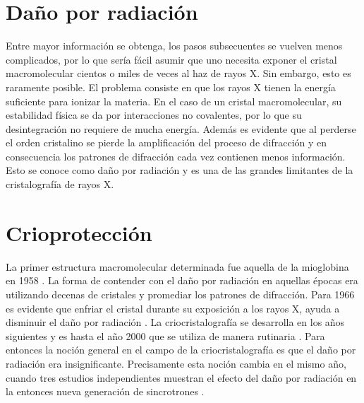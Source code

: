 \section{Daño por radiación}
Entre mayor información se obtenga, los pasos subsecuentes se vuelven menos complicados, por lo que sería fácil asumir que uno necesita exponer el cristal macromolecular cientos o miles de veces al haz de rayos X. Sin embargo, esto es raramente posible. El problema consiste en que los rayos X tienen la energía suficiente para ionizar la materia. En el caso de un cristal macromolecular, su estabilidad física se da por interacciones no covalentes, por lo que su desintegración no requiere de mucha energía. Además es evidente que al perderse el orden cristalino se pierde la amplificación del proceso de difracción y en consecuencia los patrones de difracción cada vez contienen menos información. Esto se conoce como daño por radiación y es una de las grandes limitantes de la cristalografía de rayos X.

\section{Crioprotección}
La primer estructura macromolecular determinada fue aquella de la mioglobina en 1958 \cite{Kendrew1958}. La forma de contender con el daño por radiación en aquellas épocas era utilizando decenas de cristales y promediar los patrones de difracción. Para 1966 es evidente que enfriar el cristal durante su exposición a los rayos X, ayuda a disminuir el daño por radiación \cite{Low1966}. La criocristalografía se desarrolla en los años siguientes y es hasta el año 2000 que se utiliza de manera rutinaria \cite{Garman2003}. Para entonces la noción general en el campo de la criocristalografía es que el daño por radiación era insignificante. Precisamente esta noción cambia en el mismo año, cuando tres estudios independientes muestran el efecto del daño por radiación en la entonces nueva generación de sincrotrones \cite{Teng2000, Ravelli2000, Weik2000}.

